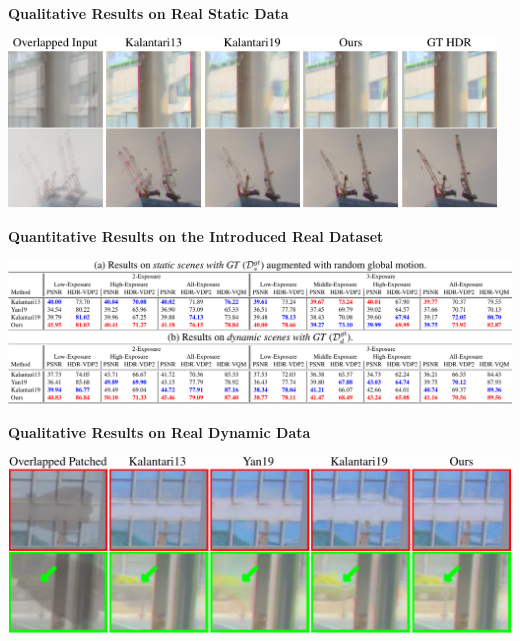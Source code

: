 \documentclass[landscape,a0paper,fontscale=0.292]{baposter}
\newcommand{\subheadercolor}{black}
\begin{document}
\begin{poster}
{\begin{minipage}[t]{0.30\linewidth}
\begin{center}
        \end{center}
    \end{minipage}
    \hfill
    \begin{minipage}[t]{0.32\linewidth}
        \textbf{\color{\subheadercolor}Qualitative Results on Real Static Data}
        \vspace{-0.8em}
        \begin{center}
            \includegraphics[width=0.97\textwidth]{images/res_qual_real_static-crop.pdf}
        \end{center}
    \end{minipage}

    \vspace{0.2em}
    \begin{minipage}[c]{0.65\linewidth}
        \textbf{\color{\subheadercolor}Quantitative Results on the Introduced Real Dataset}
        \vspace{-0.8em}
        \begin{center}
            \includegraphics[width=\textwidth]{images/res_quant_real-crop.pdf}
        \end{center}
    \end{minipage}
    \hfill
    \begin{minipage}[c]{0.34\linewidth}
        \textbf{\color{\subheadercolor}Qualitative Results on Real Dynamic Data}
        \begin{center}
            \includegraphics[width=\textwidth]{images/res_qual_real_dynamic-crop.pdf}
        \end{center}
    \end{minipage}

}
\end{poster}
\end{document}
